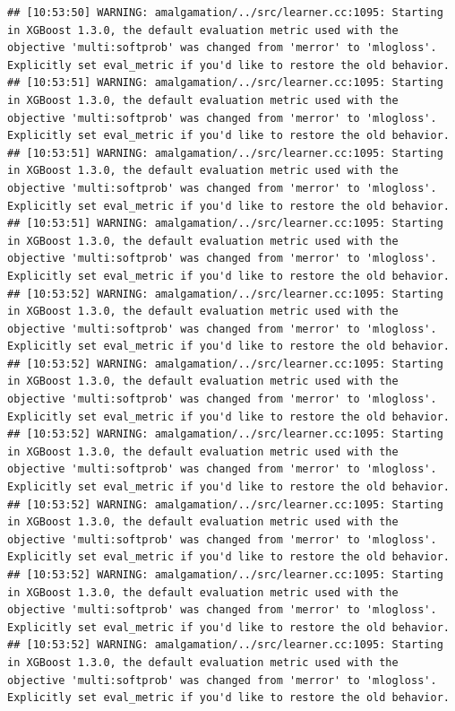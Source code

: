 \documentclass[
]{scrbook}
\begin{document}
\begin{verbatim}
## [10:53:50] WARNING: amalgamation/../src/learner.cc:1095: Starting in XGBoost 1.3.0, the default evaluation metric used with the objective 'multi:softprob' was changed from 'merror' to 'mlogloss'. Explicitly set eval_metric if you'd like to restore the old behavior.
## [10:53:51] WARNING: amalgamation/../src/learner.cc:1095: Starting in XGBoost 1.3.0, the default evaluation metric used with the objective 'multi:softprob' was changed from 'merror' to 'mlogloss'. Explicitly set eval_metric if you'd like to restore the old behavior.
## [10:53:51] WARNING: amalgamation/../src/learner.cc:1095: Starting in XGBoost 1.3.0, the default evaluation metric used with the objective 'multi:softprob' was changed from 'merror' to 'mlogloss'. Explicitly set eval_metric if you'd like to restore the old behavior.
## [10:53:51] WARNING: amalgamation/../src/learner.cc:1095: Starting in XGBoost 1.3.0, the default evaluation metric used with the objective 'multi:softprob' was changed from 'merror' to 'mlogloss'. Explicitly set eval_metric if you'd like to restore the old behavior.
## [10:53:52] WARNING: amalgamation/../src/learner.cc:1095: Starting in XGBoost 1.3.0, the default evaluation metric used with the objective 'multi:softprob' was changed from 'merror' to 'mlogloss'. Explicitly set eval_metric if you'd like to restore the old behavior.
## [10:53:52] WARNING: amalgamation/../src/learner.cc:1095: Starting in XGBoost 1.3.0, the default evaluation metric used with the objective 'multi:softprob' was changed from 'merror' to 'mlogloss'. Explicitly set eval_metric if you'd like to restore the old behavior.
## [10:53:52] WARNING: amalgamation/../src/learner.cc:1095: Starting in XGBoost 1.3.0, the default evaluation metric used with the objective 'multi:softprob' was changed from 'merror' to 'mlogloss'. Explicitly set eval_metric if you'd like to restore the old behavior.
## [10:53:52] WARNING: amalgamation/../src/learner.cc:1095: Starting in XGBoost 1.3.0, the default evaluation metric used with the objective 'multi:softprob' was changed from 'merror' to 'mlogloss'. Explicitly set eval_metric if you'd like to restore the old behavior.
## [10:53:52] WARNING: amalgamation/../src/learner.cc:1095: Starting in XGBoost 1.3.0, the default evaluation metric used with the objective 'multi:softprob' was changed from 'merror' to 'mlogloss'. Explicitly set eval_metric if you'd like to restore the old behavior.
## [10:53:52] WARNING: amalgamation/../src/learner.cc:1095: Starting in XGBoost 1.3.0, the default evaluation metric used with the objective 'multi:softprob' was changed from 'merror' to 'mlogloss'. Explicitly set eval_metric if you'd like to restore the old behavior.

\end{verbatim}
\end{document}
